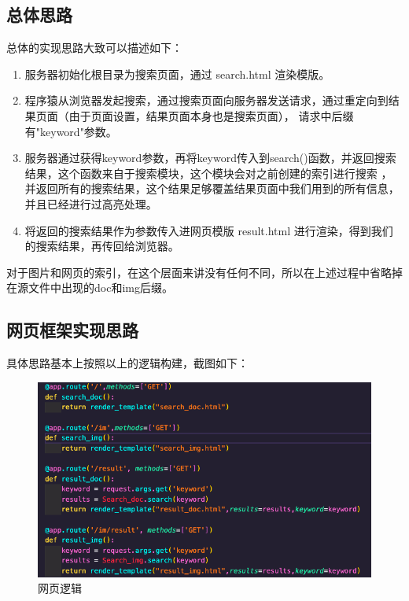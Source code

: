 \documentclass[UTF8]{ctexart}
\begin{document}
        \subsection{总体思路}
            总体的实现思路大致可以描述如下：
            \begin{enumerate}
                \item 服务器初始化根目录为搜索页面，通过 search.html 渲染模版。
                \item 程序猿从浏览器发起搜索，通过搜索页面向服务器发送请求，通过重定向到结果页面（由于页面设置，结果页面本身也是搜索页面），
                请求中后缀有"keyword"参数。
                \item 服务器通过获得keyword参数，再将keyword传入到search()函数，并返回搜索结果，这个函数来自于搜索模块，这个模块会对之前创建的索引进行搜索
                ，并返回所有的搜索结果，这个结果足够覆盖结果页面中我们用到的所有信息，并且已经进行过高亮处理。
                \item 将返回的搜索结果作为参数传入进网页模版 result.html 进行渲染，得到我们的搜索结果，再传回给浏览器。
            \end{enumerate}

            对于图片和网页的索引，在这个层面来讲没有任何不同，所以在上述过程中省略掉在源文件中出现的doc和img后缀。

        \subsection{网页框架实现思路}
            具体思路基本上按照以上的逻辑构建，截图如下：

            \begin{figure}[ht]
                \centering
                \includegraphics[scale=0.15]{img/app.png}
                \caption{网页逻辑}
            \end{figure}
\end{document}

